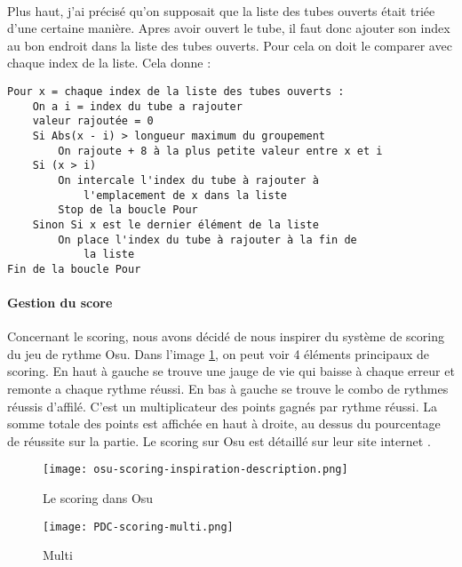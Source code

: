\paragraph{}Plus haut, j'ai précisé qu'on supposait que la liste des tubes ouverts était triée d'une certaine manière. Apres avoir ouvert le tube, il faut donc ajouter son index au
bon endroit dans la liste des tubes ouverts. Pour cela on doit le comparer avec chaque index de la liste. Cela donne :
\begin{verbatim}
Pour x = chaque index de la liste des tubes ouverts :
    On a i = index du tube a rajouter
    valeur rajoutée = 0
    Si Abs(x - i) > longueur maximum du groupement
        On rajoute + 8 à la plus petite valeur entre x et i
    Si (x > i)
        On intercale l'index du tube à rajouter à
            l'emplacement de x dans la liste
        Stop de la boucle Pour
    Sinon Si x est le dernier élément de la liste
        On place l'index du tube à rajouter à la fin de
            la liste
Fin de la boucle Pour
\end{verbatim}

\newpage
\paragraph{Gestion du score} Concernant le scoring, nous avons décidé de nous inspirer du système de scoring du jeu de rythme Osu. Dans l'image \ref{ScoringInspiration}, on peut voir 4
éléments principaux de scoring. En haut à gauche se trouve une jauge de vie qui baisse à chaque erreur et remonte a chaque rythme réussi. En bas à gauche se trouve le combo de rythmes
réussis d'affilé. C'est un multiplicateur des points gagnés par rythme réussi. La somme totale des points est affichée en haut à droite, au dessus du pourcentage de réussite sur
la partie. Le scoring sur Osu est détaillé sur leur site internet \cite{OSU}.\\

\begin{figure}[H]
    \begin{center}
    \texttt{[image: osu-scoring-inspiration-description.png]}
    \end{center}
    \caption{Le scoring dans Osu}
\label{ScoringInspiration}
\end{figure}

\begin{wrapfigure}[8]{l}{3cm}
    \vspace{-10pt}
    \texttt{[image: PDC-scoring-multi.png]}
    \captionsetup{labelformat=simpleNumber}
    \caption{Multi}
\end{wrapfigure}

